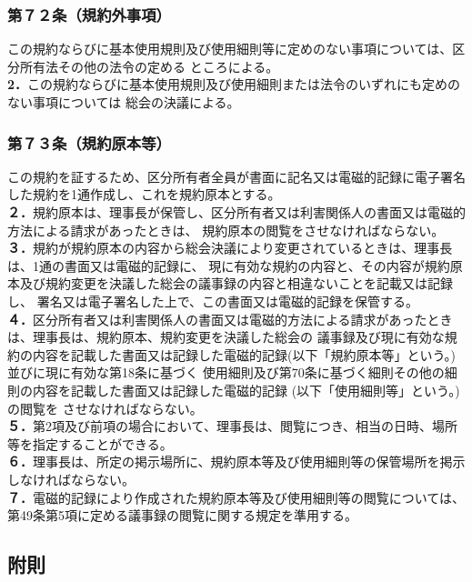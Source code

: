 \documentclass[12pt,uplatex,dvipdfmx]{jsarticle}
\begin{document}
\subsubsection*{第７２条（規約外事項）}
この規約ならびに基本使用規則及び使用細則等に定めのない事項については、区分所有法その他の法令の定める
ところによる。\\
\textbf{2．}この規約ならびに基本使用規則及び使用細則または法令のいずれにも定めのない事項については
総会の決議による。
\subsubsection*{第７３条（規約原本等）}
この規約を証するため、区分所有者全員が書面に記名又は電磁的記録に電子署名した規約を1通作成し、これを規約原本とする。\\
\textbf{２．}規約原本は、理事長が保管し、区分所有者又は利害関係人の書面又は電磁的方法による請求があったときは、
規約原本の閲覧をさせなければならない。\\
\textbf{３．}規約が規約原本の内容から総会決議により変更されているときは、理事長は、1通の書面又は電磁的記録に、
現に有効な規約の内容と、その内容が規約原本及び規約変更を決議した総会の議事録の内容と相違ないことを記載又は記録し、
署名又は電子署名した上で、この書面又は電磁的記録を保管する。\\
\textbf{４．}区分所有者又は利害関係人の書面又は電磁的方法による請求があったときは、理事長は、規約原本、規約変更を決議した総会の
議事録及び現に有効な規約の内容を記載した書面又は記録した電磁的記録(以下「規約原本等」という。)並びに現に有効な第18条に基づく
使用細則及び第70条に基づく細則その他の細則の内容を記載した書面又は記録した電磁的記録 (以下「使用細則等」という。)の閲覧を
させなければならない。\\
\textbf{５．}第2項及び前項の場合において、理事長は、閲覧につき、相当の日時、場所等を指定することができる。\\
\textbf{６．}理事長は、所定の掲示場所に、規約原本等及び使用細則等の保管場所を掲示しなければならない。\\
\textbf{７．}電磁的記録により作成された規約原本等及び使用細則等の閲覧については、第49条第5項に定める議事録の閲覧に関する規定を準用する。\\

\begin{center}
\subsection*{附則}
\end{center}
\end{document}
